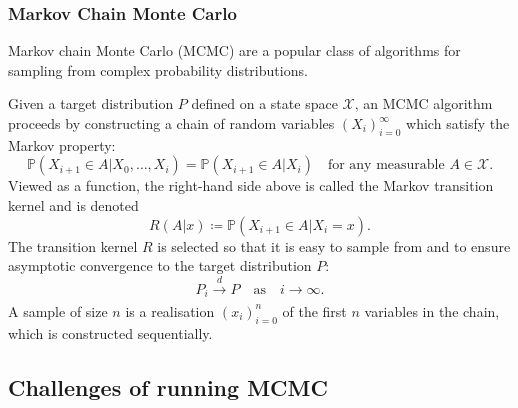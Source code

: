 \documentclass{beamer}
\begin{document}
\begin{frame}
\frametitle{Markov Chain Monte Carlo}
Markov chain Monte Carlo (MCMC) are a popular class of algorithms for sampling from complex probability distributions.

Given a target distribution $P$ defined on a state space $\mathcal{X}$, an MCMC algorithm proceeds by constructing a chain of random variables $(X_i)_{i=0}^\infty$  which satisfy the Markov property:
\begin{equation*}
\mathbb{P}(X_{i+1}\in A | X_0, \dots, X_i) = \mathbb{P}(X_{i+1}\in A | X_i) \quad\text{for any measurable } A \in \mathcal{X}.
\end{equation*}
Viewed as a function, the right-hand side above is called the Markov transition kernel and is denoted 
\begin{equation*}
R(A | x) \coloneq \mathbb{P}(X_{i+1}\in A | X_i = x).
\end{equation*}
The transition kernel $R$ is selected so that it is easy to sample from and to ensure asymptotic convergence to the target distribution $P$:
\begin{equation*}
P_i \xrightarrow[]{d} P \quad\text{as}\quad i \to \infty.
\end{equation*}
A sample of size $n$ is a realisation $(x_i)_{i=0}^n$ of the first $n$ variables in the chain, which is constructed sequentially.
\end{frame}



\subsection{Challenges of running MCMC}
\end{document}
